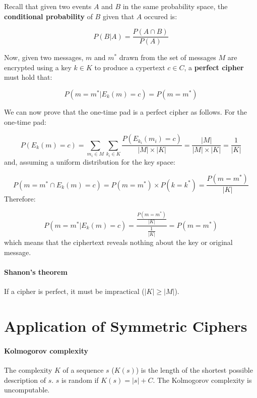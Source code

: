 \documentclass[12pt, letterpaper]{article}
\begin{document}
Recall that given two events $A$ and $B$ in the same probability space, the \textbf{conditional probability} of $B$ given that $A$ occured is:

\[
  P(B|A) = \frac{P(A \cap B)}{P(A)}
\]

Now, given two messages, $m$ and $m^*$ drawn from the set of messages $M$ are encrypted using a key $k \in K$ to produce a cypertext $c \in C$,
a \textbf{perfect cipher} must hold that:

\[
  P \left( m = m^* | E_k \left( m \right) = c \right) = P \left( m = m^* \right)
\]

We can now prove that the one-time pad is a perfect cipher as follows.
For the one-time pad:

\[
  P \left( E_k \left( m \right) = c \right) = \sum_{m_i \in M} \sum_{k_i \in K} \frac{P(E_{k_i} (m_i) = c)}{|M| \times |K|}
  = \frac{|M|}{|M| \times |K|}
  = \frac{1}{|K|}
\]
and, assuming a uniform distribution for the key space:

\[
  P \left( m = m^* \cap E_k(m) = c \right)
  = P(m = m^*) \times P(k = k^*)
  = \frac{P(m = m^*)}{|K|}
\]
Therefore:

\[
  P \left( m = m^* | E_k(m) = c \right) = \frac{\frac{P(m = m^*)}{|K|}}{\frac{1}{|K|}}
  = P(m = m^*)
\]
which means that the ciphertext reveals nothing about the key or original message.

\paragraph{Shanon's theorem} If a cipher is perfect, it must be impractical ($|K| \geq |M|$).


\section{Application of Symmetric Ciphers}

\paragraph{Kolmogorov complexity} The complexity $K$ of a sequence $s$ ($K(s)$) is the length of the shortest possible description of $s$.
$s$ is random if $K(s) = |s| + C$.
The Kolmogorov complexity is uncomputable.
\end{document}
